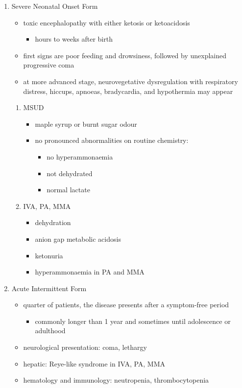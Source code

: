\documentclass{scrartcl}
\begin{document}
\begin{enumerate}
\item Severe Neonatal Onset Form
\label{sec:org674c97c}
\begin{itemize}
\item toxic encephalopathy with either ketosis or ketoacidosis
\begin{itemize}
\item hours to weeks after birth
\end{itemize}
\item first signs are poor feeding and drowsiness, followed by unexplained
progressive coma
\item at more advanced stage, neurovegetative dysregulation with
respiratory distress, hiccups, apnoeas, bradycardia, and hypothermia
may appear
\end{itemize}

\begin{enumerate}
\item MSUD
\label{sec:orgd09783e}
\begin{itemize}
\item maple syrup or burnt sugar odour
\item no pronounced abnormalities on routine chemistry:
\begin{itemize}
\item no hyperammonaemia
\item not dehydrated
\item normal lactate
\end{itemize}
\end{itemize}
\item IVA, PA, MMA
\label{sec:org8a10e23}
\begin{itemize}
\item dehydration
\item anion gap metabolic acidosis
\item ketonuria
\item hyperammonaemia in PA and MMA
\end{itemize}
\end{enumerate}

\item Acute Intermittent Form
\label{sec:org6f998e4}
\begin{itemize}
\item quarter of patients, the disease presents after a symptom-free
period
\begin{itemize}
\item commonly longer than 1 year and sometimes until adolescence or adulthood
\end{itemize}
\item neurological presentation: coma, lethargy
\item hepatic: Reye-like syndrome in IVA, PA, MMA
\item hematology and immunology: neutropenia, thrombocytopenia
\end{itemize}


\end{enumerate}
\end{document}
